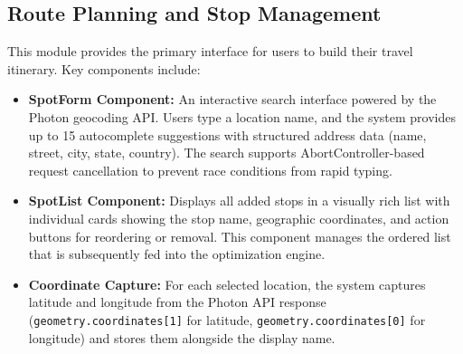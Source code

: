 \subsection{Route Planning and Stop Management}
This module provides the primary interface for users to build their travel itinerary. Key components include:
\begin{itemize}
    \item \textbf{SpotForm Component:} An interactive search interface powered by the Photon geocoding API. Users type a location name, and the system provides up to 15 autocomplete suggestions with structured address data (name, street, city, state, country). The search supports AbortController-based request cancellation to prevent race conditions from rapid typing.
    \item \textbf{SpotList Component:} Displays all added stops in a visually rich list with individual cards showing the stop name, geographic coordinates, and action buttons for reordering or removal. This component manages the ordered list that is subsequently fed into the optimization engine.
    \item \textbf{Coordinate Capture:} For each selected location, the system captures latitude and longitude from the Photon API response (\texttt{geometry.coordinates[1]} for latitude, \texttt{geometry.coordinates[0]} for longitude) and stores them alongside the display name.
\end{itemize}

